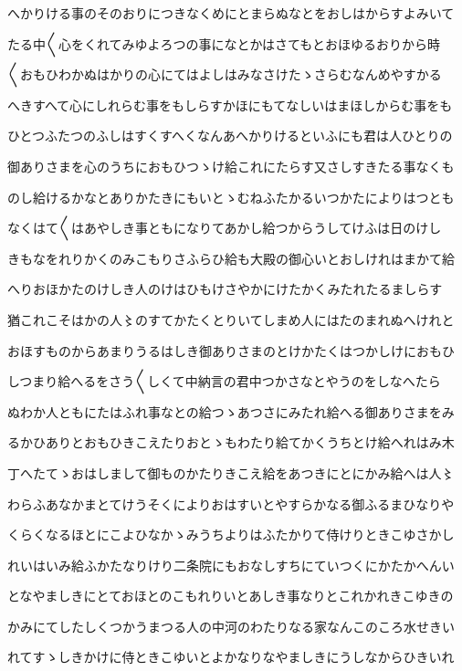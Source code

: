 \documentclass[a4paper,11pt,landscape]{ltjtarticle}
\begin{document}
へかりける事のそのおりにつきなくめにとまらぬなとをおしはからすよみいて
\par\medskip
たる中〱心をくれてみゆよろつの事になとかはさてもとおほゆるおりから時
\par\medskip
〱おもひわかぬはかりの心にてはよしはみなさけたゝさらむなんめやすかる
\par\medskip
へきすへて心にしれらむ事をもしらすかほにもてなしいはまほしからむ事をも
\par\medskip
ひとつふたつのふしはすくすへくなんあへかりけるといふにも君は人ひとりの
\par\medskip
御ありさまを心のうちにおもひつゝけ給これにたらす又さしすきたる事なくも
\par\medskip
のし給けるかなとありかたきにもいとゝむねふたかるいつかたによりはつとも
\par\medskip
なくはて〱はあやしき事ともになりてあかし給つからうしてけふは日のけし
\par\medskip
きもなをれりかくのみこもりさふらひ給も大殿の御心いとおしけれはまかて給
\par\medskip
へりおほかたのけしき人のけはひもけさやかにけたかくみたれたるましらす
\par\medskip
猶これこそはかの人〻のすてかたくとりいてしまめ人にはたのまれぬへけれと
\par\medskip
おほすものからあまりうるはしき御ありさまのとけかたくはつかしけにおもひ
\par\medskip
しつまり給へるをさう〱しくて中納言の君中つかさなとやうのをしなへたら
\par\medskip
ぬわか人ともにたはふれ事なとの給つゝあつさにみたれ給へる御ありさまをみ
\par\medskip
るかひありとおもひきこえたりおとゝもわたり給てかくうちとけ給へれはみ木
\par\medskip
丁へたてゝおはしまして御ものかたりきこえ給をあつきにとにかみ給へは人〻
\par\medskip
わらふあなかまとてけうそくによりおはすいとやすらかなる御ふるまひなりや
\par\medskip
くらくなるほとにこよひなかゝみうちよりはふたかりて侍けりときこゆさかし
\par\medskip
れいはいみ給ふかたなりけり二条院にもおなしすちにていつくにかたかへんい
\par\medskip
となやましきにとておほとのこもれりいとあしき事なりとこれかれきこゆきの
\par\medskip
かみにてしたしくつかうまつる人の中河のわたりなる家なんこのころ水せきい
\par\medskip
れてすゝしきかけに侍ときこゆいとよかなりなやましきにうしなからひきいれ
\end{document}
